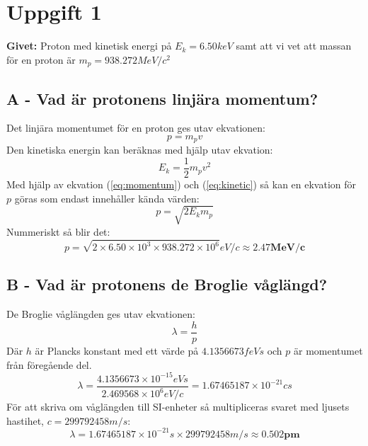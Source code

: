 \documentclass{article}
\begin{document}
  \section*{Uppgift 1}
    \textbf{Givet:} Proton med kinetisk energi på $E_k=6.50keV$ samt att vi vet att massan för en proton är $m_p=938.272MeV/c^2$

    \subsection*{A - Vad är protonens linjära momentum?}
      Det linjära momentumet för en proton ges utav ekvationen:
      \begin{equation}
        p=m_pv
        \label{eq:momentum}
      \end{equation}
      Den kinetiska energin kan beräknas med hjälp utav ekvation:
      \begin{equation}
        E_k=\frac{1}{2}m_pv^2
        \label{eq:kinetic}
      \end{equation}
      Med hjälp av ekvation (\ref{eq:momentum}) och (\ref{eq:kinetic}) så kan en ekvation för $p$ göras som endast innehåller kända värden:
      \begin{equation}
        p=\sqrt{2E_km_p}
      \end{equation}
      Nummeriskt så blir det:
      \begin{equation}
        p=\sqrt{2\times6.50\times10^3\times938.272\times10^6}eV/c\approx\mathbf{2.47MeV/c}
      \end{equation}

    \subsection*{B - Vad är protonens de Broglie våglängd?}
      De Broglie våglängden ges utav ekvationen:
      \begin{equation}
        \lambda=\frac{h}{p}
      \end{equation}
      Där $h$ är Plancks konstant med ett värde på $4.1356673feVs$ och $p$ är momentumet från föregående del.
      \begin{equation}
        \lambda=\frac{4.1356673\times10^{-15}eVs}{2.469568\times10^{6}eV/c}=1.67465187\times10^{-21}cs
      \end{equation}
      För att skriva om våglängden till SI-enheter så multipliceras svaret med ljusets hastihet, $c=299792458m/s$:
      \begin{equation}
        \lambda=1.67465187\times10^{-21}s\times299792458m/s\approx\mathbf{0.502pm}
      \end{equation}
\end{document}
